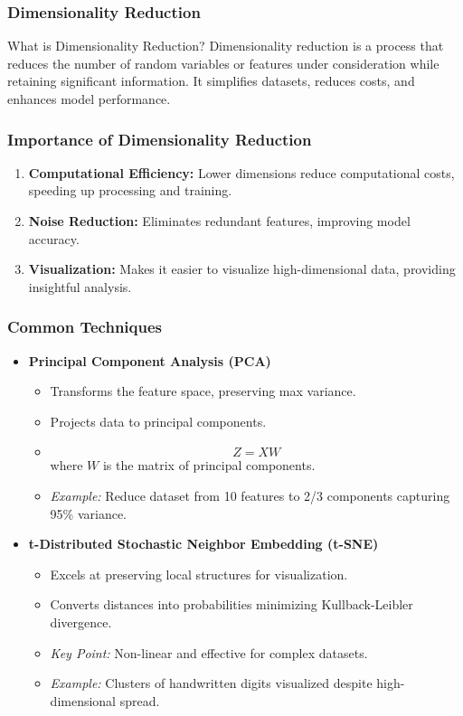 \documentclass[aspectratio=169]{beamer}
\begin{document}
\begin{frame}[fragile]
    \frametitle{Dimensionality Reduction}
    \begin{block}{What is Dimensionality Reduction?}
        Dimensionality reduction is a process that reduces the number of random variables or features under consideration while retaining significant information. It simplifies datasets, reduces costs, and enhances model performance.
    \end{block}
\end{frame}

\begin{frame}[fragile]
    \frametitle{Importance of Dimensionality Reduction}
    \begin{enumerate}
        \item \textbf{Computational Efficiency:} Lower dimensions reduce computational costs, speeding up processing and training.
        \item \textbf{Noise Reduction:} Eliminates redundant features, improving model accuracy.
        \item \textbf{Visualization:} Makes it easier to visualize high-dimensional data, providing insightful analysis.
    \end{enumerate}
\end{frame}

\begin{frame}[fragile]
    \frametitle{Common Techniques}
    \begin{itemize}
        \item \textbf{Principal Component Analysis (PCA)}
        \begin{itemize}
            \item Transforms the feature space, preserving max variance.
            \item Projects data to principal components.
            \item \begin{equation} Z = XW \end{equation} where \( W \) is the matrix of principal components.
            \item \textit{Example:} Reduce dataset from 10 features to 2/3 components capturing 95\% variance.
        \end{itemize}
        
        \item \textbf{t-Distributed Stochastic Neighbor Embedding (t-SNE)}
        \begin{itemize}
            \item Excels at preserving local structures for visualization.
            \item Converts distances into probabilities minimizing Kullback-Leibler divergence.
            \item \textit{Key Point:} Non-linear and effective for complex datasets.
            \item \textit{Example:} Clusters of handwritten digits visualized despite high-dimensional spread.
        \end{itemize}
    \end{itemize}
\end{frame}
\end{document}
